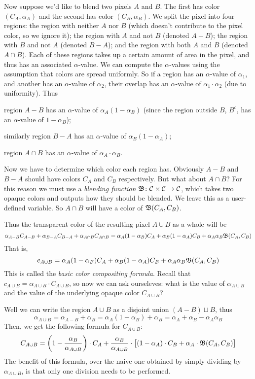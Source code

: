 Now suppose we'd like to blend two pixels $A$ and $B$.
The first has color $(C_A,\alpha_A)$ and the second has color $(C_B,\alpha_B)$.
We split the pixel into four regions: the region with neither $A$ nor $B$ (which doesn't contribute to the
pixel color, so we ignore it); the region with $A$ and not $B$ (denoted $A-B$); the region with $B$ and not
$A$ (denoted $B-A$); and the region with both $A$ and $B$ (denoted $A\cap B$).
Each of these regions takes up a certain amount of area in the pixel, and thus has an associated
$\alpha$-value.
We can compute the $\alpha$-values using the assumption that colors are spread uniformly.
So if a region has an $\alpha$-value of $\alpha_1$, and another has an $\alpha$-value of $\alpha_2$, their
overlap has an $\alpha$-value of $\alpha_1\cdot\alpha_2$ (due to uniformity).
Thus
\blist
    \item region $A-B$ has an $\alpha$-value of $\alpha_A(1-\alpha_B)$ (since the region outside $B$, $B^c$,
    has an $\alpha$-value of $1-\alpha_B$);
    \item similarly region $B-A$ has an $\alpha$-value of $\alpha_B(1-\alpha_A)$;
    \item region $A\cap B$ has an $\alpha$-value of $\alpha_A\cdot\alpha_B$.
\elist

Now we have to determine which color each region has.
Obviously $A-B$ and $B-A$ should have colors $C_A$ and $C_B$ respectively.
But what about $A\cap B$?
For this reason we must use a {\it blending function} ${\frak B}\colon{\cal C}\times{\cal C}\to{\cal C}$, which takes two opaque
colors and outputs how they should be blended.
We leave this as a user-defined variable.
So $A\cap B$ will have a color of ${\frak B}(C_A,C_B)$.

Thus the transparent color of the resulting pixel $A\cup B$ as a whole will be
$$ \alpha_{A-B}C_{A-B} + \alpha_{B-A}C_{B-A} + \alpha_{A\cap B}C_{A\cap B} =
\alpha_A(1-\alpha_B)C_A + \alpha_B(1-\alpha_A)C_B + \alpha_A\alpha_B{\frak B}(C_A,C_B) $$
That is,
$$ c_{A\cup B} = \alpha_A(1-\alpha_B)C_A + \alpha_B(1-\alpha_A)C_B + \alpha_A\alpha_B{\frak B}(C_A,C_B) $$
This is called the {\it basic color compositing formula}.
Recall that $c_{A\cup B}=\alpha_{A\cup B}\cdot C_{A\cup B}$, so now we can ask ourseleves: what is
the value of $\alpha_{A\cup B}$ and the value of the underlying opaque color $C_{A\cup B}$?

Well we can write the region $A\cup B$ as a disjoint union $(A-B)\sqcup B$, thus
$$ \alpha_{A\cup B} = \alpha_{A-B} + \alpha_{B} = \alpha_A(1-\alpha_B) + \alpha_B =
\alpha_A + \alpha_B - \alpha_A\alpha_B $$
Then, we get the following formula for $C_{A\cup B}$:
$$ C_{A\cup B} = \left(1-{{\alpha_B}\over{\alpha_{A\cup B}}}\right)\cdot C_A +
{{\alpha_B}\over{\alpha_{A\cup B}}}\cdot\bigl[(1-\alpha_A)\cdot C_B+\alpha_A\cdot{\frak B}(C_A,C_B)\bigr] $$
The benefit of this formula, over the naive one obtained by simply dividing by $\alpha_{A\cup B}$, is that only
one division needs to be performed.

